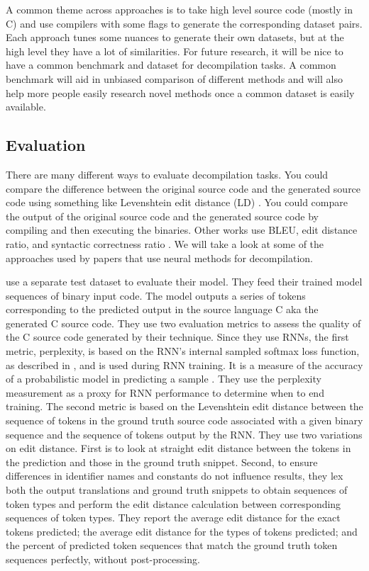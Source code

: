 \documentclass{article}
\begin{document}
A common theme across approaches is to take high level source code (mostly in C) and use compilers with some flags to generate the corresponding dataset pairs. Each approach tunes some nuances to generate their own datasets, but at the high level they have a lot of similarities. For future research, it will be nice to have a common benchmark and dataset for decompilation tasks. A common benchmark will aid in unbiased comparison of different methods and will also help more people easily research novel methods once a common dataset is easily available.

\subsection{Evaluation}
There are many different ways to evaluate decompilation tasks. You could compare the difference between the original source code and the generated source code using something like Levenshtein edit distance (LD) \cite{hyyro2001explaining}. You could compare the output of the original source code and the generated source code by compiling and then executing the binaries. Other works use BLEU, edit distance ratio, and syntactic correctness ratio \cite{nguyen2013lexical}. We will take a look at some of the approaches used by papers that use neural methods for decompilation.

\citet{katz2018using} use a separate test dataset to evaluate their model. They feed their trained model sequences of binary input code. The model outputs a series of tokens corresponding to the predicted output in the source language C aka the generated C source code. They use two evaluation metrics to assess the quality of the C source code generated by their technique. Since they use RNNs, the first metric, perplexity, is based on the RNN’s internal sampled softmax loss function, as described in \citet{jean2014using}, and is used during RNN training. It is a measure of the accuracy of a probabilistic model in predicting a sample \cite{shannon2001mathematical}. They use the perplexity measurement as a proxy for RNN performance to determine when to end training. The second metric is
based on the Levenshtein edit distance between the sequence of tokens in the ground truth source code associated with a given binary sequence and the sequence of tokens output by the RNN. They use two variations on edit distance. First is to look at straight edit distance between the tokens in the prediction and those in the ground truth snippet. Second, to ensure differences in identifier names and constants do not influence results, they lex both the output translations and ground truth snippets to obtain sequences of token types and perform the edit distance calculation between corresponding sequences of token types. They report the average edit distance for the exact tokens predicted; the average edit distance for the types of tokens predicted; and the percent of predicted token sequences that match the ground truth token sequences perfectly, without post-processing.
\end{document}
